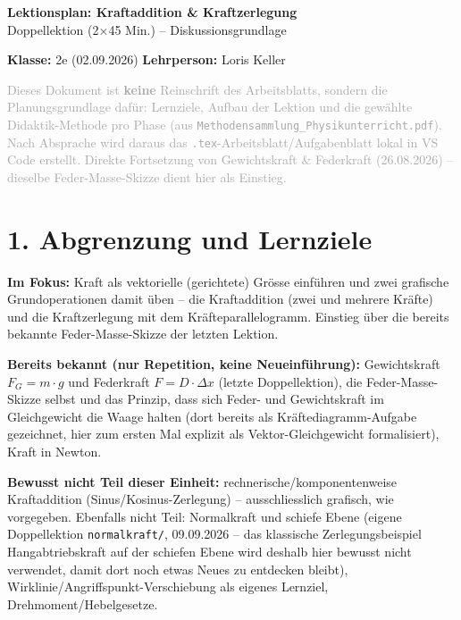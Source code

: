 \documentclass[11pt,a4paper]{article}
\begin{document}
\sloppy

\begin{center}
{\Huge\bfseries\color{titleblue}Lektionsplan: Kraftaddition \& Kraftzerlegung}\\[0.4em]
{\large Doppellektion (2$\times$45 Min.) -- Diskussionsgrundlage}
\end{center}
\vspace{0.5em}

\noindent\textbf{Klasse:} 2e (02.09.2026) \hfill \textbf{Lehrperson:} Loris Keller

\vspace{0.3em}
\noindent\textcolor{darkgray}{Dieses Dokument ist \textbf{keine} Reinschrift des Arbeitsblatts, sondern die
Planungsgrundlage dafür: Lernziele, Aufbau der Lektion und die gewählte
Didaktik-Methode pro Phase (aus \texttt{Methodensammlung\_Physikunterricht.pdf}).
Nach Absprache wird daraus das \texttt{.tex}-Arbeitsblatt/Aufgabenblatt lokal in
VS Code erstellt. Direkte Fortsetzung von Gewichtskraft \& Federkraft
(26.08.2026) -- dieselbe Feder-Masse-Skizze dient hier als Einstieg.}

\section*{1. Abgrenzung und Lernziele}

\textbf{Im Fokus:} Kraft als vektorielle (gerichtete) Grösse einführen und
zwei grafische Grundoperationen damit üben -- die Kraftaddition (zwei und
mehrere Kräfte) und die Kraftzerlegung mit dem Kräfteparallelogramm.
Einstieg über die bereits bekannte Feder-Masse-Skizze der letzten Lektion.

\textbf{Bereits bekannt (nur Repetition, keine Neueinführung):}
Gewichtskraft $F_G=m\cdot g$ und Federkraft $F=D\cdot\Delta x$ (letzte
Doppellektion), die Feder-Masse-Skizze selbst und das Prinzip, dass sich
Feder- und Gewichtskraft im Gleichgewicht die Waage halten (dort bereits
als Kräftediagramm-Aufgabe gezeichnet, hier zum ersten Mal explizit als
Vektor-Gleichgewicht formalisiert), Kraft in Newton.

\textbf{Bewusst nicht Teil dieser Einheit:} rechnerische/komponentenweise
Kraftaddition (Sinus/Kosinus-Zerlegung) -- ausschliesslich grafisch, wie
vorgegeben. Ebenfalls nicht Teil: Normalkraft und schiefe Ebene (eigene
Doppellektion \texttt{normalkraft/}, 09.09.2026 -- das klassische
Zerlegungsbeispiel \glqq Hangabtriebskraft auf der schiefen Ebene\grqq{}
wird deshalb hier bewusst nicht verwendet, damit dort noch etwas Neues zu
entdecken bleibt), Wirklinie/Angriffspunkt-Verschiebung als eigenes
Lernziel, Drehmoment/Hebelgesetze.
\end{document}

